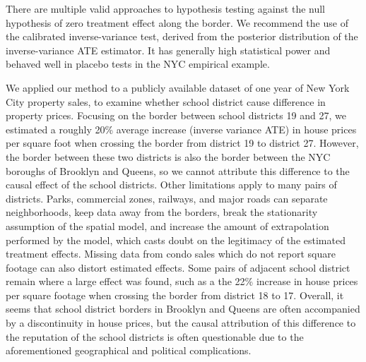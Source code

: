 \documentclass[letter]{article}
\begin{document}
There are multiple valid approaches to hypothesis testing against the null hypothesis of zero treatment effect along the border.
We recommend the use of the calibrated inverse-variance test, derived from the posterior distribution of the inverse-variance ATE estimator.
It has generally high statistical power and behaved well in placebo tests in the NYC empirical example.
    


    	We applied our method to a publicly available dataset of one year of New York City property sales, to examine whether school district cause difference in property prices.
Focusing on the border between school districts 19 and 27, we estimated a roughly 20\% average increase (inverse variance ATE) in house prices per square foot when crossing the border from district 19 to district 27.
However, the border between these two districts is also the border between the NYC boroughs of Brooklyn and Queens, so we cannot attribute this difference to the causal effect of the school districts.
Other limitations apply to many pairs of districts.
Parks, commercial zones, railways, and major roads can separate neighborhoods, keep data away from the borders, break the stationarity assumption of the spatial model, and increase the amount of extrapolation performed by the model, which casts doubt on the legitimacy of the estimated treatment effects.
Missing data from condo sales which do not report square footage can also distort estimated effects.
Some pairs of adjacent school district remain where a large effect was found, such as a the 22\% increase in house prices per square footage when crossing the border from district 18 to 17.
Overall, it seems that school district borders in Brooklyn and Queens are often accompanied by a discontinuity in house prices, but the causal attribution of this difference to the reputation of the school districts is often questionable due to the aforementioned geographical and political complications.
    
\end{document}
